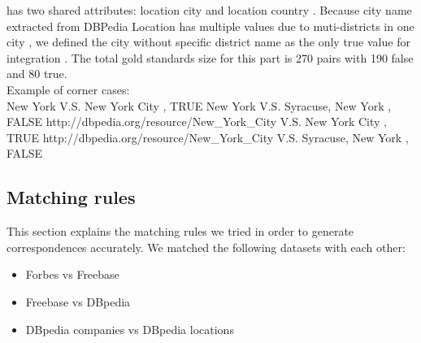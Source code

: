 has two shared attributes: location city and location country . Because city name extracted from DBPedia Location has multiple values due to muti-districts in one city , we defined the city without specific district name as the only true value for integration . The total gold standards size for this part is 270 pairs with 190 false and 80 true.\\
Example of corner cases: \\
New York V.S. New York City , TRUE
New York V.S. Syracuse, New York , FALSE
http://dbpedia.org/resource/New_York_City V.S. New York City , TRUE
http://dbpedia.org/resource/New_York_City V.S. Syracuse, New York , FALSE


\newpage
\subsection{Matching rules}
This section explains the matching rules we tried in order to generate correspondences accurately. We matched the following datasets with each other:
\begin{itemize}[noitemsep,topsep=0pt,parsep=0pt,partopsep=0pt]
\item Forbes vs Freebase
\item Freebase vs DBpedia
\item DBpedia companies vs DBpedia locations
\end{itemize}


